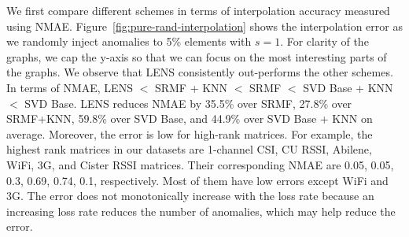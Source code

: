 We first compare different schemes in
terms of interpolation accuracy measured using NMAE.
Figure~\ref{fig:pure-rand-interpolation} shows the interpolation error
as we randomly inject anomalies to 5\% elements with $s=1$. For clarity of the graphs, we cap the y-axis so
that we can focus on the most interesting parts of the graphs. 
We observe that %
LENS consistently out-performs the other schemes. In terms of NMAE,
LENS $<$ SRMF + KNN $<$
 SRMF $<$ SVD Base + KNN $<$ SVD Base.
 LENS reduces NMAE by 35.5\% over SRMF, 27.8\% over SRMF+KNN, 59.8\%
 over SVD Base, and 44.9\% over SVD Base + KNN on average. Moreover,
 the error is low for high-rank matrices. For example, the highest
 rank matrices in our datasets are 1-channel CSI, CU RSSI, Abilene,
 WiFi, 3G, and Cister RSSI matrices. Their corresponding NMAE are
 0.05, 0.05, 0.3, 0.69, 0.74, 0.1, respectively. Most of them have low
 errors except WiFi and 3G. %
The error does not monotonically increase with
the loss rate because an increasing loss rate reduces the number of
anomalies, which may help reduce the error. 

